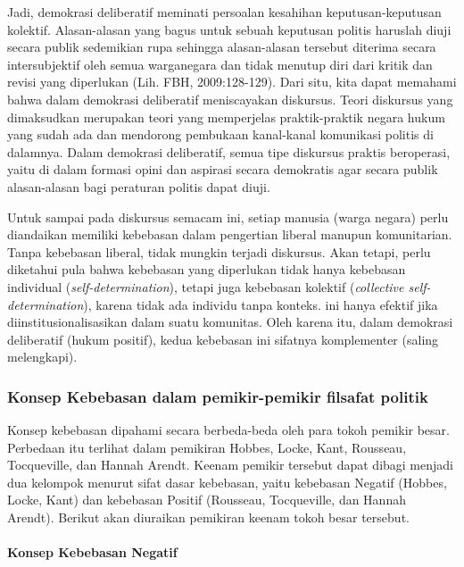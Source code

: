 \documentclass[10pt,a4paper]{article}
\begin{document}
\begin{multicols}{2}
Jadi, demokrasi deliberatif meminati persoalan kesahihan
keputusan-keputusan kolektif. Alasan-alasan yang bagus untuk sebuah
keputusan politis haruslah diuji secara publik sedemikian rupa sehingga
alasan-alasan tersebut diterima secara intersubjektif oleh semua
warganegara dan tidak menutup diri dari kritik dan revisi yang
diperlukan (Lih. FBH, 2009:128-129). Dari situ, kita dapat memahami
bahwa dalam demokrasi deliberatif meniscayakan diskursus. Teori
diskursus yang dimaksudkan merupakan teori yang memperjelas
praktik-praktik negara hukum yang sudah ada dan mendorong pembukaan
kanal-kanal komunikasi politis di dalamnya. Dalam demokrasi deliberatif,
semua tipe diskursus praktis beroperasi, yaitu di dalam formasi opini
dan aspirasi secara demokratis agar secara publik alasan-alasan bagi
peraturan politis dapat diuji.

Untuk sampai pada diskursus semacam ini, setiap manusia (warga negara)
perlu diandaikan memiliki kebebasan dalam pengertian liberal manupun
komunitarian. Tanpa kebebasan liberal, tidak mungkin terjadi diskursus.
Akan tetapi, perlu diketahui pula bahwa kebebasan yang diperlukan tidak
hanya kebebasan individual (\emph{self-determination}), tetapi juga
kebebasan kolektif (\emph{collective self-determination}), karena tidak
ada individu tanpa konteks. ini hanya efektif jika
diinstitusionalisasikan dalam suatu komunitas. Oleh karena itu, dalam
demokrasi deliberatif (hukum positif), kedua kebebasan ini sifatnya
komplementer (saling melengkapi).

\hypertarget{konsep-kebebasan-dalam-pemikir-pemikir-filsafat-politik}{%
\subsubsection{Konsep Kebebasan dalam pemikir-pemikir filsafat
politik}\label{konsep-kebebasan-dalam-pemikir-pemikir-filsafat-politik}}

Konsep kebebasan dipahami secara berbeda-beda oleh para tokoh pemikir
besar. Perbedaan itu terlihat dalam pemikiran Hobbes, Locke, Kant,
Rousseau, Tocqueville, dan Hannah Arendt. Keenam pemikir tersebut dapat
dibagi menjadi dua kelompok menurut sifat dasar kebebasan, yaitu
kebebasan Negatif (Hobbes, Locke, Kant) dan kebebasan Positif (Rousseau,
Tocqueville, dan Hannah Arendt). Berikut akan diuraikan pemikiran keenam
tokoh besar tersebut.

\hypertarget{konsep-kebebasan-negatif}{%
\paragraph{Konsep Kebebasan Negatif}\label{konsep-kebebasan-negatif}}


\end{multicols}
\end{document}
